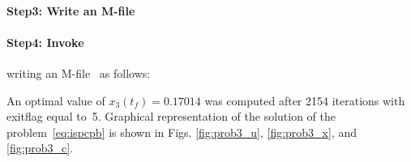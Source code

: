 {\small }

\paragraph{Step3: Write an M-file~}

{\small }

\paragraph{Step4: Invoke~} writing an
M-file~ as follows: 

{\small }

An optimal value of $x_{3}(t_{f})=0.17014$ was computed after 2154
iterations with exitflag equal to~5. Graphical representation of the
solution of the problem~\eqref{eq:ispcpb} is shown in
Figs. \ref{fig:prob3_u}, \ref{fig:prob3_x}, and \ref{fig:prob3_c}.

